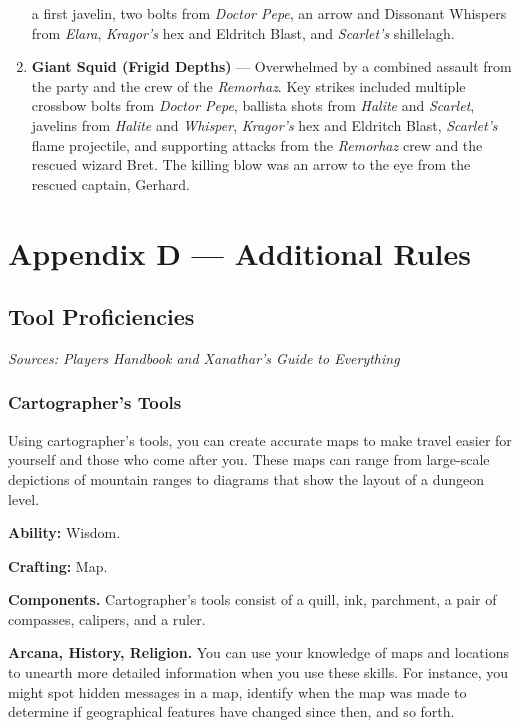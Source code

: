 \documentclass[
  letterpaper,12pt,twoside,twocolumn,openany,
  nodeprecatedcode,bg=full]{dndbook}
\begin{document}
\begin{enumerate}
  a first javelin, two bolts from \emph{Doctor Pepe}, an arrow and
  Dissonant Whispers from \emph{Elara}, \emph{Kragor's} hex and Eldritch
  Blast, and \emph{Scarlet's} shillelagh.
\item
  \textbf{Giant Squid (Frigid Depths)} --- Overwhelmed by a combined
  assault from the party and the crew of the \emph{Remorhaz}. Key
  strikes included multiple crossbow bolts from \emph{Doctor Pepe},
  ballista shots from \emph{Halite} and \emph{Scarlet}, javelins from
  \emph{Halite} and \emph{Whisper}, \emph{Kragor's} hex and Eldritch
  Blast, \emph{Scarlet's} flame projectile, and supporting attacks from
  the \emph{Remorhaz} crew and the rescued wizard Bret. The killing blow
  was an arrow to the eye from the rescued captain, Gerhard.
\end{enumerate}

\chapter{Appendix D --- Additional
Rules}\label{appendix-d-additional-rules}

\section{Tool Proficiencies}\label{tool-proficiencies}

\emph{Sources: Players Handbook and Xanathar's Guide to Everything}

\subsection{Cartographer's Tools}\label{cartographers-tools}

Using cartographer's tools, you can create accurate maps to make travel
easier for yourself and those who come after you. These maps can range
from large-scale depictions of mountain ranges to diagrams that show the
layout of a dungeon level.

\textbf{Ability:} Wisdom.

\textbf{Crafting:} Map.

\textbf{Components.} Cartographer's tools consist of a quill, ink,
parchment, a pair of compasses, calipers, and a ruler.

\textbf{Arcana, History, Religion.} You can use your knowledge of maps
and locations to unearth more detailed information when you use these
skills. For instance, you might spot hidden messages in a map, identify
when the map was made to determine if geographical features have changed
since then, and so forth.
\end{document}
